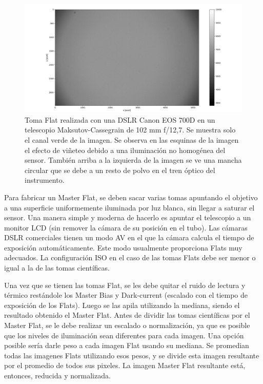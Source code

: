 \documentclass[a4paper, 12pt]{article}
\begin{document}
\begin{figure}[!ht]
  \centering
  \includegraphics[width=\textwidth]{img/flatx.png}
  \caption{\label{fig:flat} Toma Flat realizada con una DSLR Canon EOS 700D en un telescopio Maksutov-Cassegrain de 102 mm f/12,7. Se muestra solo el canal verde de la imagen. Se observa en las esquinas de la imagen el efecto de viñeteo debido a una iluminación no homogénea del sensor. También arriba a la izquierda de la imagen se ve una mancha circular que se debe a un resto de polvo en el tren óptico del instrumento.}
\end{figure}

Para fabricar un Master Flat, se deben sacar varias tomas apuntando el objetivo a una superficie uniformemente iluminada por luz blanca, sin llegar a saturar el sensor. Una manera simple y moderna de hacerlo es apuntar el telescopio a un monitor LCD (sin remover la cámara de su posición en el tubo). Las cámaras DSLR comerciales tienen un modo AV en el que la cámara calcula el tiempo de exposición automáticamente. Este modo usualmente proporciona Flats muy adecuados. La configuración ISO en el caso de las tomas Flats debe ser menor o igual a la de las tomas científicas.

Una vez que se tienen las tomas Flat, se les debe quitar el ruido de lectura y térmico restándole los Master Bias y Dark-current (escalado con el tiempo de exposición de los Flats). Luego se las apila utilizando la mediana, siendo el resultado obtenido el Master Flat. Antes de dividir las tomas científicas por el Master Flat, se le debe realizar un escalado o normalización, ya que es posible que los niveles de iluminación sean diferentes para cada imagen. Una opción posible sería darle peso a cada imagen Flat usando su mediana. Se promedian todas las imagenes Flats utilizando esos pesos, y se divide esta imagen resultante por el promedio de todos sus pixeles. La imagen Master Flat resultante está, entonces, reducida y normalizada.
\end{document}
